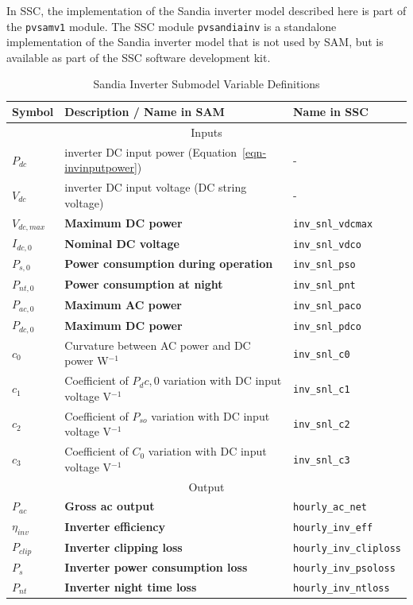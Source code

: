 \documentclass[12pt,letterpaper]{article}
\begin{document}
In SSC, the implementation of the Sandia inverter model described here is part of the \texttt{pvsamv1} module. The SSC module \texttt{pvsandiainv} is a standalone implementation of the Sandia inverter model that is not used by SAM, but is available as part of the SSC software development kit.

\begin{table}
\begin{center}
\caption{Sandia Inverter Submodel Variable Definitions}
\begin{tabular}{lll}
\midrule
Symbol & Description / \textbf{Name in SAM} & Name in SSC \\
\midrule
\multicolumn{3}{c}{Inputs}\\
$P_{dc}$ & inverter DC input power (Equation~\ref{eqn-invinputpower}) & - \\
$V_{dc}$ & inverter DC input voltage (DC string voltage) & - \\
$V_{dc,max}$ & \textbf{Maximum DC power} & \texttt{inv\_snl\_vdcmax} \\
$I_{dc,0}$ & \textbf{Nominal DC voltage} & \texttt{inv\_snl\_vdco} \\
$P_{s,0}$ & \textbf{Power consumption during operation} & \texttt{inv\_snl\_pso} \\
$P_{nt,0}$ & \textbf{Power consumption at night} & \texttt{inv\_snl\_pnt} \\
$P_{ac,0}$ & \textbf{Maximum AC power} & \texttt{inv\_snl\_paco} \\
$P_{dc,0}$ & \textbf{Maximum DC power} & \texttt{inv\_snl\_pdco} \\
$c_0$ & Curvature between AC power and DC power W$^{-1}$ & \texttt{inv\_snl\_c0} \\
$c_1$ & Coefficient of $P_dc,0$ variation with DC input voltage V$^{-1}$ &  \texttt{inv\_snl\_c1} \\
$c_2$ & Coefficient of $P_{so}$ variation with DC input voltage V$^{-1}$ &\texttt{inv\_snl\_c2} \\
$c_3$ & Coefficient of $C_0$ variation with DC input voltage V$^{-1}$ & \texttt{inv\_snl\_c3} \\
\midrule
\multicolumn{3}{c}{Output}\\
$P_{ac}$ & \textbf{Gross ac output} & \texttt{hourly\_ac\_net} \\
$\eta_{inv}$ & \textbf{Inverter efficiency} & \texttt{hourly\_inv\_eff}  \\
$P_{clip}$ & \textbf{Inverter clipping loss} & \texttt{hourly\_inv\_cliploss}  \\
$P_{s}$ & \textbf{Inverter power consumption loss}& \texttt{hourly\_inv\_psoloss}  \\
$P_{nt}$ & \textbf{Inverter night time loss}& \texttt{hourly\_inv\_ntloss}  \\
\hline
\end{tabular}
\label{tab-sandiainvertervars}
\end{center}
\end{table}
\end{document}
